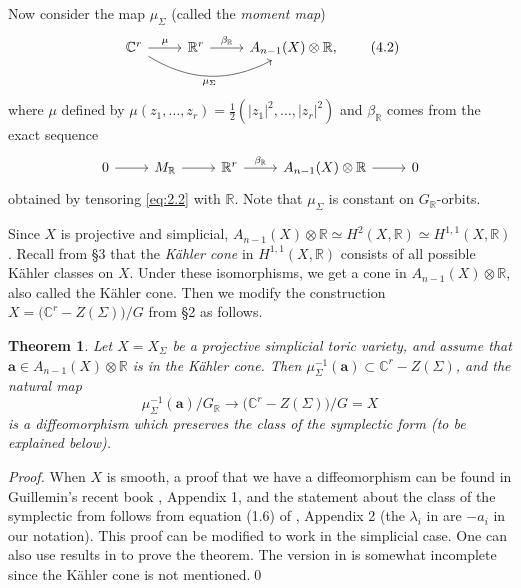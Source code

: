 \documentclass{amsart}
\theoremstyle{plain}
\newtheorem{theorem}{Theorem}[section]
\theoremstyle{definition}
\begin{document}
	Now consider the map $\mu_\Sigma$ (called the {\it moment map\/})
\begin{equation}
\begin{tikzcd}
\mathbb{C}^r \arrow[r, "\mu"] \arrow[rr, "\mu_\Sigma"', bend right] & \mathbb{R}^r \arrow[r, "\beta_{\mathbb{R}}"] & A_{n-1}(X)\otimes\mathbb{R},
\end{tikzcd}
\tag{4.2}\label{eq:4.2}
\end{equation}
where $\mu$ defined by $\mu(z_1,\dots,z_r) = \frac{1}{2}
(|z_1|^2,\dots,|z_r|^2)$ and $\beta_{\mathbb{R}}$ comes from
the exact sequence
\[
\begin{tikzcd}
0 \arrow[r] & M_{\mathbb{R}} \arrow[r] & \mathbb{R}^r \arrow[r, "\beta_{\mathbb{R}}"] & A_{n-1}(X)\otimes\mathbb{R} \arrow[r] & 0
\end{tikzcd}
\]
obtained by tensoring \eqref{eq:2.2} with $\mathbb{R}$.  Note that
$\mu_\Sigma$ is constant on $G_{\mathbb{R}}$-orbits.

	Since $X$ is projective and simplicial,
$A_{n-1}(X)\otimes\mathbb{R} \simeq H^2(X,\mathbb{R}) \simeq
H^{1,1}(X,\mathbb{R})$.  Recall from \S3 that the {\it K\"ahler cone\/}
in $H^{1,1}(X,\mathbb{R})$ consists of all possible K\"ahler classes on
$X$.  Under these isomorphisms, we get a cone in
$A_{n-1}(X)\otimes\mathbb{R}$, also called the K\"ahler cone.  Then we
modify the construction $X = \big(\mathbb{C}^r - Z(\Sigma)\big)/G$ from
\S2 as follows.

\begin{theorem} Let $X = X_\Sigma$ be a projective simplicial
toric variety, and assume that $\mathbf{a} \in A_{n-1}(X)\otimes\mathbb{R}$ is in the K\"ahler cone.  Then $\mu_\Sigma^{-1}(\mathbf{a}) \subset
\mathbb{C}^r - Z(\Sigma)$, and the natural map
\[
\mu_\Sigma^{-1}(\mathbf{a})/G_{\mathbb{R}} \longrightarrow \big(\mathbb{C}^r
- Z(\Sigma)\big)/G = X
\]
is a diffeomorphism which preserves the class of the symplectic form
(to be explained below).
\end{theorem}

\begin{proof} When $X$ is smooth, a proof that we have a diffeomorphism
can be found in Guillemin's recent book \cite{Gui}, Appendix 1,
and the statement about the class of the symplectic from follows from
equation (1.6) of \cite{Gui}, Appendix 2 (the $\lambda_i$ in
\cite{Gui} are $-a_i$ in our notation).  This proof can be modified to
work in the simplicial case.  One can also use results in \cite{Kir}
to prove the theorem.  The version in \cite{Aud} is somewhat
incomplete since the K\"ahler cone is not mentioned.\qed
\end{proof}
\end{document}
